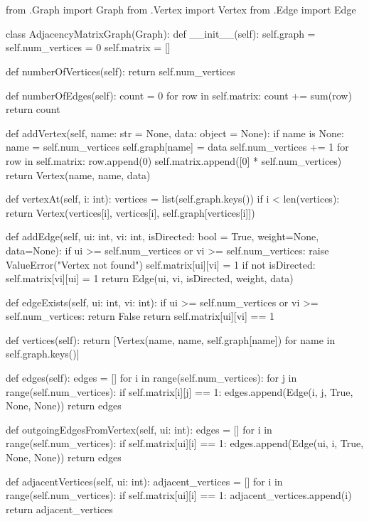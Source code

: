 \documentclass{article}
\begin{document}
\section{} %
\begin{python}
from .Graph import Graph
from .Vertex import Vertex
from .Edge import Edge



class AdjacencyMatrixGraph(Graph):
    def __init__(self):
        self.graph = {}
        self.num_vertices = 0
        self.matrix = []

    def numberOfVertices(self):
        return self.num_vertices

    def numberOfEdges(self):
        count = 0
        for row in self.matrix:
            count += sum(row)
        return count

    def addVertex(self, name: str = None, data: object = None):
        if name is None:
            name = self.num_vertices
        self.graph[name] = data
        self.num_vertices += 1
        for row in self.matrix:
            row.append(0)
        self.matrix.append([0] * self.num_vertices)
        return Vertex(name, name, data)

    def vertexAt(self, i: int):
        vertices = list(self.graph.keys())
        if i < len(vertices):
            return Vertex(vertices[i], vertices[i], self.graph[vertices[i]])

    def addEdge(self, ui: int, vi: int, isDirected: bool = True, weight=None, data=None):
        if ui >= self.num_vertices or vi >= self.num_vertices:
            raise ValueError("Vertex not found")
        self.matrix[ui][vi] = 1
        if not isDirected:
            self.matrix[vi][ui] = 1
        return Edge(ui, vi, isDirected, weight, data)

    def edgeExists(self, ui: int, vi: int):
        if ui >= self.num_vertices or vi >= self.num_vertices:
            return False
        return self.matrix[ui][vi] == 1

    def vertices(self):
        return [Vertex(name, name, self.graph[name]) for name in self.graph.keys()]

    def edges(self):
        edges = []
        for i in range(self.num_vertices):
            for j in range(self.num_vertices):
                if self.matrix[i][j] == 1:
                    edges.append(Edge(i, j, True, None, None))
        return edges

    def outgoingEdgesFromVertex(self, ui: int):
        edges = []
        for i in range(self.num_vertices):
            if self.matrix[ui][i] == 1:
                edges.append(Edge(ui, i, True, None, None))
        return edges

    def adjacentVertices(self, ui: int):
        adjacent_vertices = []
        for i in range(self.num_vertices):
            if self.matrix[ui][i] == 1:
                adjacent_vertices.append(i)
        return adjacent_vertices
\end{python}
\end{document}

